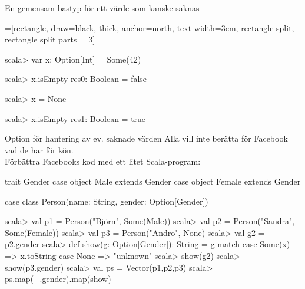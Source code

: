 \begin{Slide}{En gemensam bastyp för ett värde som kanske saknas}\SlideFontSmall
\vspace{-0.0em}\begin{center}
\newcommand{\TextBox}[1]{\raisebox{0pt}[1em][0.5em]{#1}}
=[rectangle, draw=black,  thick, anchor=north, text width=3cm, rectangle split, rectangle split parts = 3]
\end{center}
\pause
\vspace{-0.5em}\begin{REPL}
scala> var x: Option[Int] = Some(42)

scala> x.isEmpty
res0: Boolean = false

scala> x = None

scala> x.isEmpty
res1: Boolean = true
\end{REPL}
\end{Slide}


\begin{Slide}{Option för hantering av ev. saknade värden}\SlideFontSmall
Alla vill inte berätta för Facebook vad de har för kön. \\ Förbättra Facebooks kod med ett litet Scala-program:
\begin{Code}
trait Gender
case object Male   extends Gender
case object Female extends Gender

case class Person(name: String, gender: Option[Gender])
\end{Code}
\pause
\begin{REPL}
scala> val p1 = Person("Björn",  Some(Male))
scala> val p2 = Person("Sandra", Some(Female))
scala> val p3 = Person("Andro",  None)
scala> val g2 = p2.gender
scala> def show(g: Option[Gender]): String = g match {
         case Some(x) => x.toString
         case None    => "unknown"
       }
scala> show(g2)
scala> show(p3.gender)
scala> val ps = Vector(p1,p2,p3)
scala> ps.map(_.gender).map(show)
\end{REPL}
\end{Slide}

